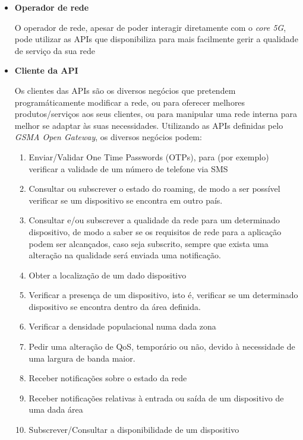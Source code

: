 \begin{itemize} \item \textbf{Operador de rede}

	      O operador de rede, apesar de poder interagir diretamente com o \emph{core
		      5G}, pode utilizar as APIs que disponibiliza para mais facilmente gerir a
	      qualidade de serviço da sua rede

	\item{\textbf{Cliente da API}}

	      Os clientes das APIs são os diversos negócios que pretendem
	      programáticamente modificar a rede, ou para oferecer melhores
	      produtos/serviços aos seus clientes, ou para manipular uma rede interna
	      para melhor se adaptar às suas necessidades. Utilizando as APIs definidas
	      pelo \emph{GSMA Open Gateway}, os diversos negócios podem:
	      \begin{enumerate} \item Enviar/Validar One Time Passwords (OTPs), para (por
		            exemplo) verificar a validade de um número de telefone via SMS \item
		            Consultar ou subscrever o estado do roaming, de modo a ser possível
		            verificar se um dispositivo se encontra em outro país. \item Consultar
		            e/ou subscrever a qualidade da rede para um determinado dispositivo, de
		            modo a saber se os requisitos de rede para a aplicação podem ser
		            alcançados, caso seja subscrito, sempre que exista uma alteração na
		            qualidade será enviada uma notificação.

		      \item Obter a localização de um dado dispositivo \item Verificar a
		            presença de um dispositivo, isto é, verificar se um determinado
		            dispositivo se encontra dentro da área definida. \item Verificar a
		            densidade populacional numa dada zona \item Pedir uma alteração de QoS,
		            temporário ou não, devido à necessidade de uma largura de banda maior.
		      \item Receber notificações sobre o estado da rede \item Receber
		            notificações relativas à entrada ou saída de um dispositivo de uma dada
		            área \item Subscrever/Consultar a disponibilidade de um dispositivo
	      \end{enumerate} \end{itemize}

